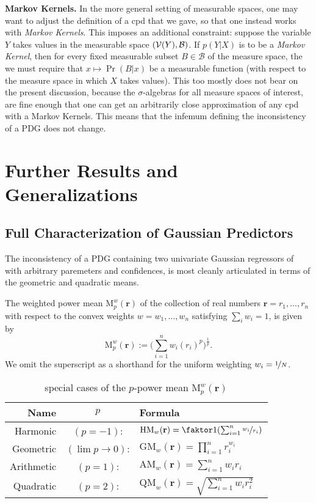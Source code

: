 \begin{subappendices}
\textbf{Markov Kernels.} In the more general setting of measurable spaces, one may want to adjust the definition of a cpd that we gave, so that one instead works with \emph{Markov Kernels}.
This imposes an additional constraint: suppose the variable $Y$ takes values in the measurable space $(\mathcal V(Y), \mathcal B)$. If $p(Y|X)$ is to be a \emph{Markov Kernel}, then for every fixed measurable subset $B \in \mathcal B$ of the measure space, the we must require that  $x \mapsto \Pr(B|x)$ be a measurable function (with respect to the measure space in which $X$ takes values).
This too mostly does not bear on the present discussion, because the $\sigma$-algebras for all measure spaces of interest, are fine enough that one can get an arbitrarily close approximation of any cpd with a Markov Kernels.
This means that the infemum defining the inconsistency of a PDG does not change.

\section{Further Results and Generalizations}
\subsection{Full Characterization of Gaussian Predictors}
The inconsistency of a PDG containing two univariate Gaussian regressors of with arbitrary paremeters and confidences, is most cleanly articulated in terms of the geometric and quadratic means.

\begin{defn}
	The weighted power mean $\mathrm M^w_p(\mathbf r)$ of the collection of real numbers $\mathbf r = r_1, \ldots, r_n$ with respect to the convex weights $w = w_1, \ldots, w_n$ satisfying $\sum_iw_i = 1$, is given by
	\[
		\mathrm M^w_p(\mathbf r) := \Big(\sum_{i=1}^n w_i (r_i)^p \Big)^{\frac1p}.
	\]
	We omit the superscript as a shorthand for the uniform weighting $w_i = \nicefrac{1}{N}$.
\end{defn}

\begin{table}
\centering
\renewcommand{\arraystretch}{1.5} %
\begin{tabular}{rcl}
	\textbf{Name} & $p$ & \textbf{Formula}\\\hline
	Harmonic&$(p=-1)$:& $\mathrm{HM}_w(\mathbf r) = \faktor1{\left(\sum_{i=1}^n \nicefrac{w_i}{r_i}\right)}$ \\
	Geometric&$(\lim {p\to 0})$:& $\mathrm{GM}_w(\mathbf r) = \prod_{i=1}^n r_i^{w_i}$ \\
	Arithmetic&$(p=1)$:& $\mathrm{AM}_w(\mathbf r) = \sum_{i=1}^n w_i r_i$ \\
	Quadratic&$(p=2)$:& $\mathrm{QM}_w(\mathbf r) = \sqrt{\textstyle\sum_{i=1}^n w_i r_i^2}$\\\hline
	\end{tabular}
	\caption{special cases of the $p$-power mean $\mathrm M_p^w(\mathbf r)$}
	\label{tab:power-means}
\end{table}


\end{subappendices}
